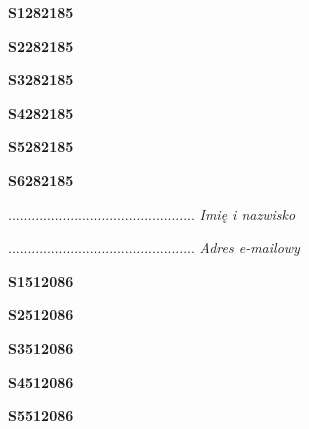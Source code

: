 \begin{turn}{90}\huge \textbf{S1282185}\end{turn}

\begin{turn}{90}\huge \textbf{S2282185}\end{turn}

\begin{turn}{90}\huge \textbf{S3282185}\end{turn}

\begin{turn}{90}\huge \textbf{S4282185}\end{turn}

\begin{turn}{90}\huge \textbf{S5282185}\end{turn}

\begin{turn}{90}\huge \textbf{S6282185}\end{turn}

\begin{turn}{90}\begin{minipage}{\linewidth} \vspace{20mm} ................................................  \textit{Imię i nazwisko}\end{minipage}\end{turn}

\begin{turn}{90}\begin{minipage}{\linewidth} \vspace{20mm} ................................................  \textit{Adres e-mailowy}\end{minipage}\end{turn}

\begin{turn}{90}\huge \textbf{S1512086}\end{turn}

\begin{turn}{90}\huge \textbf{S2512086}\end{turn}

\begin{turn}{90}\huge \textbf{S3512086}\end{turn}

\begin{turn}{90}\huge \textbf{S4512086}\end{turn}

\begin{turn}{90}\huge \textbf{S5512086}\end{turn}


